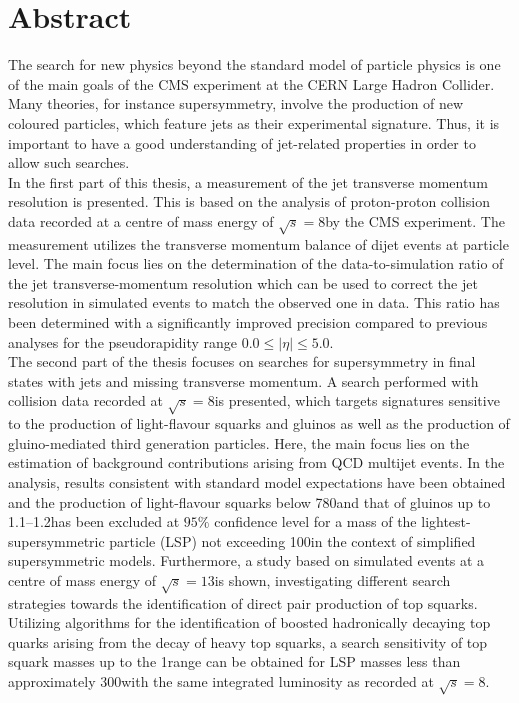 \section*{Abstract}
The search for new physics beyond the standard model of particle physics is one of the main goals of the CMS experiment at the CERN Large Hadron Collider. Many theories, for instance supersymmetry, involve the production of new coloured particles, which feature jets as their experimental signature. Thus, it is important to have a good understanding of jet-related properties in order to allow such searches.\\
In the first part of this thesis, a measurement of the jet transverse momentum resolution is presented. This is based on the analysis of proton-proton collision data recorded at a centre of mass energy of $\sqrt{s}=8$\tev by the CMS experiment. The measurement utilizes the transverse momentum balance of dijet events at particle level. The main focus lies on the determination of the data-to-simulation ratio of the jet transverse-momentum resolution which can be used to correct the jet resolution in simulated events to match the observed one in data. This ratio has been determined with a significantly improved precision compared to previous analyses for the pseudorapidity range $0.0 \leq |\eta| \leq 5.0$. \\ 
The second part of the thesis focuses on searches for supersymmetry in final states with jets and missing transverse momentum. A search performed with collision data recorded at $\sqrt{s}=8$\tev is presented, which targets signatures sensitive to the production of light-flavour squarks and gluinos as well as the production of gluino-mediated third generation particles. Here, the main focus lies on the estimation of background contributions arising from QCD multijet events. In the analysis, results consistent with standard model expectations have been obtained and the production of light-flavour squarks below 780\gev and that of gluinos up to 1.1--1.2\tev has been excluded at $95\%$ confidence level for a mass of the lightest-supersymmetric particle (LSP) not exceeding 100\gev in the context of simplified supersymmetric models. Furthermore, a study based on simulated events at a centre of mass energy of  $\sqrt{s}=13$\tev is shown, investigating different search strategies towards the identification of direct pair production of top squarks. Utilizing algorithms for the identification of boosted hadronically decaying top quarks arising from the decay of heavy top squarks, a search sensitivity of top squark masses up to the 1\tev range can be obtained for LSP masses less than approximately 300\gev with the same integrated luminosity as recorded at $\sqrt{s}=8$\tev.   
